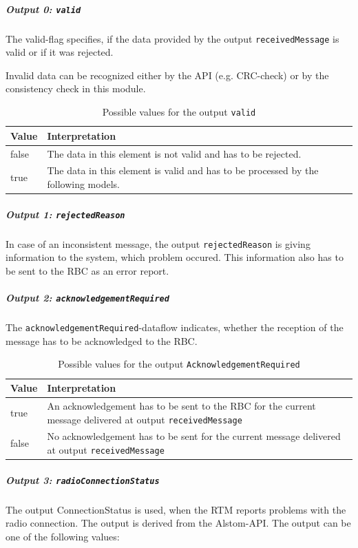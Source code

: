 \documentclass{template/openetcs_report}
\begin{document}
\subparagraph{Output 0: \texttt{valid}}
The valid-flag specifies, if the data provided by the output \texttt{receivedMessage} is valid or if it was rejected.

Invalid data can be recognized either by the API (e.g. CRC-check) or by the consistency check in this module.

\begin{table}[H]
  \begin{tabular}{| l | p{13cm} |}
    \hline
    \textbf{Value} & \textbf{Interpretation}\\ \hline
    false & The data in this element is not valid and has to be rejected. \\
    true & The data in this element is valid and has to be processed by the following models. \\
    \hline
  \end{tabular} 
  \caption{Possible values for the output \texttt{valid}}
  \label{tbl:rcvvalid}
\end{table}

\subparagraph{Output 1: \texttt{rejectedReason}}
In case of an inconsistent message, the output \texttt{rejectedReason} is giving information to the system, which problem occured. This information also has to be sent to the RBC as an error report.

\subparagraph{Output 2: \texttt{acknowledgementRequired}}

The \texttt{acknowledgementRequired}-dataflow indicates, whether the reception of the message has to be acknowledged to the RBC.

\begin{table}[H]
  \begin{tabular}{| l | p{13cm} |}
    \hline
    \textbf{Value} & \textbf{Interpretation}\\ \hline
    true & An acknowledgement has to be sent to the RBC for the current message delivered at output \texttt{receivedMessage} \\
    false & No acknowledgement has to be sent for the current message delivered at output \texttt{receivedMessage} \\
    \hline
  \end{tabular} 
  \caption{Possible values for the output \texttt{AcknowledgementRequired}}
  \label{tbl:AcknowledgementRequiredTable}
\end{table}

\subparagraph{Output 3: \texttt{radioConnectionStatus}}
The output ConnectionStatus is used, when the RTM reports problems with the radio connection. The output is derived from the Alstom-API. %
The output can be one of the following values:
\end{document}
